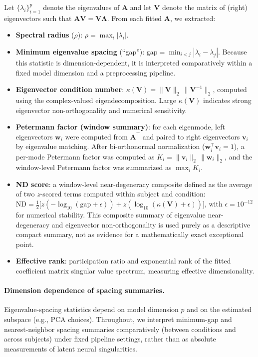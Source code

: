 \documentclass[preprint,12pt,nonatbib]{elsarticle}
\begin{document}
Let $\{\lambda_i\}_{i=1}^p$ denote the eigenvalues of $\mathbf{A}$ and let $\mathbf{V}$ denote the matrix of (right) eigenvectors such that $\mathbf{A}\mathbf{V}=\mathbf{V}\boldsymbol{\Lambda}$. From each fitted $\mathbf{A}$, we extracted:

\begin{itemize}[leftmargin=1.5em]
    \item \textbf{Spectral radius} ($\rho$): $\rho=\max_i |\lambda_i|$.
    \item \textbf{Minimum eigenvalue spacing} (``gap''): $\mathrm{gap}=\min_{i<j} |\lambda_i-\lambda_j|$. Because this statistic is dimension-dependent, it is interpreted comparatively within a fixed model dimension and a preprocessing pipeline.
    \item \textbf{Eigenvector condition number}: $\kappa(\mathbf{V})=\|\mathbf{V}\|_2\,\|\mathbf{V}^{-1}\|_2$, computed using the complex-valued eigendecomposition. Large $\kappa(\mathbf{V})$ indicates strong eigenvector non-orthogonality and numerical sensitivity.
    \item \textbf{Petermann factor (window summary)}: for each eigenmode, left eigenvectors $\mathbf{w}_i$ were computed from $\mathbf{A}^\top$ and paired to right eigenvectors $\mathbf{v}_i$ by eigenvalue matching. After bi-orthonormal normalization ($\mathbf{w}_i^\top\mathbf{v}_i=1$), a per-mode Petermann factor was computed as $K_i=\|\mathbf{v}_i\|_2\,\|\mathbf{w}_i\|_2$, and the window-level Petermann factor was summarized as $\max_i K_i$.
    \item \textbf{ND score}: a window-level near-degeneracy composite defined as the average of two $z$-scored terms computed within subject and condition: $\mathrm{ND} = \tfrac{1}{2}\big[z(-\log_{10}(\mathrm{gap}+\epsilon)) + z(\log_{10}(\kappa(\mathbf{V})+\epsilon))\big]$, with $\epsilon=10^{-12}$ for numerical stability. This composite summary of eigenvalue near-degeneracy and eigenvector non-orthogonality is used purely as a descriptive compact summary, not as evidence for a mathematically exact exceptional point.
    \item \textbf{Effective rank}: participation ratio and exponential rank of the fitted coefficient matrix singular value spectrum, measuring effective dimensionality.
\end{itemize}

\paragraph{Dimension dependence of spacing summaries.} Eigenvalue-spacing statistics depend on model dimension $p$ and on the estimated subspace (e.g., PCA choices). Throughout, we interpret minimum-gap and nearest-neighbor spacing summaries comparatively (between conditions and across subjects) under fixed pipeline settings, rather than as absolute measurements of latent neural singularities.
\end{document}
